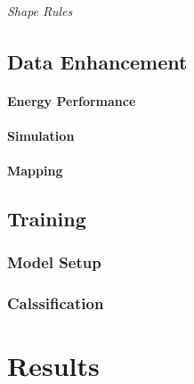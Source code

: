 \documentclass[a4paper,11pt]{report}
\begin{document}
                \subparagraph{Shape Rules}
                
                    \lipsum[6-8]

    \section{Data Enhancement}

        \lipsum[9-17]
        
        \subsubsection{Energy Performance}
        
            \lipsum[6-8]

        \subsubsection{Simulation}
        
            \lipsum[6-8]
            
        \subsubsection{Mapping}
        
            \lipsum[6-8]
            
    \section{Training}
    
        \lipsum[9-17]
        
        \subsection{Model Setup}
    
            \lipsum[9-17]

        \subsection{Calssification}
    
            \lipsum[9-17]
        
\chapter{Results}

    \lipsum[2-10]
    
\end{document}

